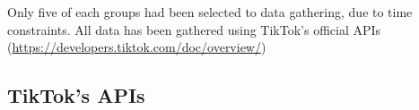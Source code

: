 Only five of each groups had been selected to data gathering, due to time constraints. All data has been gathered using TikTok's official APIs (\url{https://developers.tiktok.com/doc/overview/})

\subsection{TikTok's APIs}
